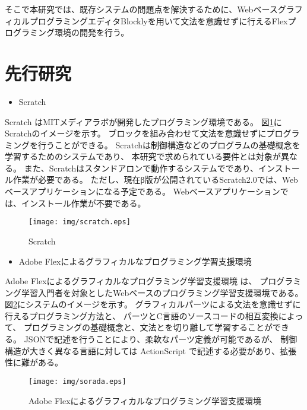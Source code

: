 \documentclass{risepaper}
\begin{document}
そこで本研究では、既存システムの問題点を解決するために、WebベースグラフィカルプログラミングエディタBlocklyを用いて文法を意識せずに行えるFlexプログラミング環境の開発を行う。

\section{先行研究}

\begin{itemize}
\item Scratch
\end{itemize}
Scratch \cite{Thesis03}はMITメディアラボが開発したプログラミング環境である。
図\ref{fig:Scratch}にScratchのイメージを示す。
ブロックを組み合わせて文法を意識せずにプログラミングを行うことができる。
Scratchは制御構造などのプログラムの基礎概念を学習するためのシステムであり、
本研究で求められている要件とは対象が異なる。
また、Scratchはスタンドアロンで動作するシステムでであり、インストール作業が必要である。
ただし、現在β版が公開されているScratch2.0では、Webベースアプリケーションになる予定である。
Webベースアプリケーションでは、インストール作業が不要である。
\newpage

\begin{figure}[h]
\begin{center}
\texttt{[image: img/scratch.eps]}
\caption{Scratch}%
\label{fig:Scratch}
\end{center}%
\end{figure}%

\begin{itemize}
\item Adobe Flexによるグラフィカルなプログラミング学習支援環境
\end{itemize}

Adobe Flexによるグラフィカルなプログラミング学習支援環境 \cite{Thesis01,Thesis02}は、
プログラミング学習入門者を対象としたWebベースのプログラミング学習支援環境である。
図\ref{fig:sorada}にシステムのイメージを示す。
グラフィカルパーツによる文法を意識せずに行えるプログラミング方法と、
パーツとC言語のソースコードの相互変換によって、
プログラミングの基礎概念と、文法とを切り離して学習することができる。
JSONで記述を行うことにより、柔軟なパーツ定義が可能であるが、
制御構造が大きく異なる言語に対しては ActionScript で記述する必要があり、拡張性に難がある。

\newpage

\begin{figure}[h]
\begin{center}
\texttt{[image: img/sorada.eps]}
\caption{Adobe Flexによるグラフィカルなプログラミング学習支援環境}%
\label{fig:sorada}
\end{center}%
\end{figure}%
\end{document}

